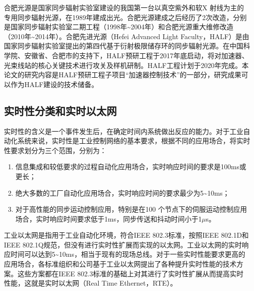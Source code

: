 合肥光源是国家同步辐射实验室建设的我国第一台以真空紫外和软X 射线为主的专用同步辐射光源，在1989年建成出光。合肥光源建成之后经历了2次改造，分别是国家同步辐射实验室二期工程（1998年\textasciitilde2004年）和合肥光源重大维修改造（2010年\textasciitilde2014年）。合肥先进光源（Hefei Advanced Light Faculty，HALF）是由国家同步辐射实验室提出的第四代基于衍射极限储存环的同步辐射光源。在中国科学院、安徽省、合肥市的支持下，HALF预研工程于2017年底启动，将对加速器、光束线站的核心关键技术进行攻关及样机研制。HALF工程计划于2020年完成。本论文的研究内容是HALF预研工程子项目“加速器控制技术”的一部分，研究成果可以作为HALF建设的技术储备。

\subsection{实时性分类和实时以太网}
实时性的含义是一个事件发生后，在确定时间内系统做出反应的能力。对于工业自动化系统来说，实时性是工业控制网络的基本要求，根据不同的应用场合，将实时性要求划分为三个范围，分别为：

\begin{enumerate}[itemindent=1em,label=(\arabic*)]
	\item 信息集成和较低要求的过程自动化应用场合，实时响应时间的要求是100ms或更长；
	\item 绝大多数的工厂自动化应用场合，实时响应时间的要求最少为5\textasciitilde10ms；
	\item 对于高性能的同步运动控制应用，特别是在100 个节点下的伺服运动控制应用场合，实时响应时间要求低于1ms，同步传送和抖动时间小于1$\mu$s\cite{liao-2005}。
\end{enumerate}

工业以太网是指用于工业自动化环境，符合IEEE 802.3标准，按照IEEE 802.1D和IEEE 802.1Q规范，但没有进行实时性扩展而实现的以太网。工业以太网的实时响应时间可以达到5\textasciitilde10ms，相当于现有的现场总线。对于一些实时性能要求更高的应用场合，各标准组织和公司基于工业以太网提出了各种提升实时性能的技术方案。这些方案都在IEEE 802.3标准的基础上对其进行了实时性扩展从而提高实时性能，这就是实时以太网（Real Time Ethernet，RTE）。

